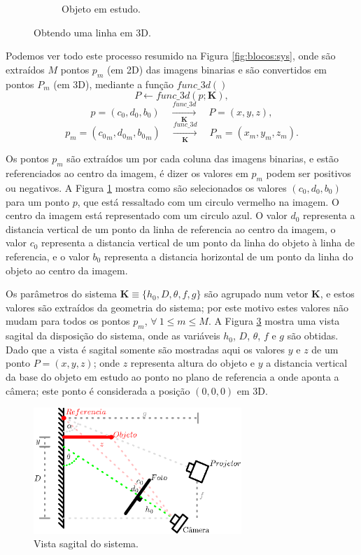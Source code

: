 \documentclass[12pt]{article}
\begin{document}
\begin{figure}[!h]
\begin{subfigure}[b]{0.425\textwidth}
         \caption{Objeto em estudo.}
         \label{fig:blocos:obj}
     \end{subfigure}
\caption{Obtendo uma linha em 3D.}
\label{fig:blocos}
\end{figure}
Podemos ver todo este processo resumido na Figura \ref{fig:blocos:sys},
onde são extraídos $M$ pontos $p_m$ (em 2D) das imagens binarias 
e são convertidos em pontos $P_m$ (em 3D),
mediante a função $func\_3d()$ 
\begin{equation}
P \leftarrow func\_3d(p;\mathbf{K}),
\end{equation}
\begin{equation}
p=(c_0,d_0,b_0)\quad \xrightarrow[\mathbf{K}]{func\_3d} \quad P=(x,y,z),
\end{equation}
\begin{equation}
p_m=({c_0}_m,{d_0}_m,{b_0}_m)\quad \xrightarrow[\mathbf{K}]{func\_3d}\quad P_m=(x_m,y_m,z_m).
\end{equation}

Os pontos $p_m$ são extraídos um por cada coluna das imagens binarias,
e estão referenciados ao centro da imagem, é dizer os valores em $p_m$ podem ser positivos ou negativos.
A Figura \ref{fig:blocos:obj} mostra como são selecionados os valores $(c_0,d_0,b_0)$ para um ponto $p$,
que está ressaltado com um circulo vermelho na imagem. 
O centro da imagem está representado com um circulo azul.
O valor $d_0$ representa a distancia vertical de um ponto da linha de referencia ao centro da imagem,
o valor $c_0$ representa a distancia vertical de um ponto da linha do objeto à linha de referencia, e
o valor $b_0$   representa a distancia horizontal de um ponto da linha do objeto ao centro da imagem.

Os parâmetros do sistema $\mathbf{K}\equiv \{h_0,D,\theta,f,g\}$ são agrupado num vetor $\mathbf{K}$,
e estos valores são extraídos da geometria do sistema; 
por este motivo estes valores não mudam para todos os pontos $p_m$, $\forall~ 1\leq m \leq M$.
A Figura \ref{fig:setup1} mostra uma vista sagital da disposição do sistema,
onde as variáveis $h_0$, $D$, $\theta$, $f$ e $g$ são obtidas. 
Dado que a vista é sagital somente são mostradas aqui os valores $y$ e $z$
de um ponto $P=(x,y,z)$;
onde $z$ representa  altura do objeto e 
$y$ a distancia vertical da base do objeto em estudo ao ponto no plano de referencia a onde aponta a câmera;
este ponto é considerada a posição $(0,0,0)$ em 3D.
\begin{figure}[!h]
     \centering
         \includegraphics[width=0.7\textwidth]{Diagrama1.eps}
\caption{Vista sagital do sistema.}
\label{fig:setup1}
\end{figure}
\end{document}
